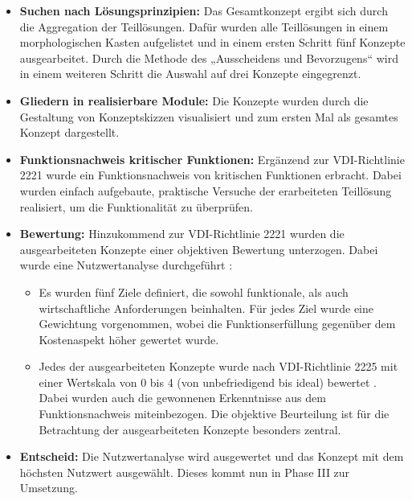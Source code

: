 \begin{itemize}
	\item \textbf{Suchen nach Lösungsprinzipien:} Das Gesamtkonzept ergibt sich durch die Aggregation der Teillösungen. Dafür wurden alle Teillösungen in einem morphologischen Kasten aufgelistet und in einem ersten Schritt fünf Konzepte ausgearbeitet. Durch die Methode des „Ausscheidens und Bevorzugens“ \cite{naefe} wird in einem weiteren Schritt die Auswahl auf drei Konzepte eingegrenzt.
	
	\item \textbf{Gliedern in realisierbare Module:} Die Konzepte wurden durch die Gestaltung von Konzeptskizzen visualisiert und zum ersten Mal als gesamtes Konzept dargestellt. 
	
	\item \textbf{Funktionsnachweis kritischer Funktionen:} Ergänzend zur VDI-Richtlinie 2221 wurde ein Funktionsnachweis von kritischen Funktionen erbracht. Dabei wurden einfach aufgebaute, praktische Versuche der erarbeiteten Teillösung realisiert, um die Funktionalität zu überprüfen.
	
	\item \textbf{Bewertung:} Hinzukommend zur VDI-Richtlinie 2221 wurden die ausgearbeiteten Konzepte einer objektiven Bewertung unterzogen. Dabei wurde eine Nutzwertanalyse durchgeführt \cite{pahl}:
	\begin{itemize}
		\item Es wurden fünf Ziele definiert, die sowohl funktionale, als auch wirtschaftliche Anforderungen beinhalten. Für jedes Ziel wurde eine Gewichtung vorgenommen, wobei die Funktionserfüllung gegenüber dem Kostenaspekt höher gewertet wurde.
		
		\item Jedes der ausgearbeiteten Konzepte wurde nach VDI-Richtlinie 2225 mit einer Wertskala von 0 bis 4 (von unbefriedigend bis ideal) bewertet \cite{vdi2225}. Dabei wurden auch die gewonnenen Erkenntnisse aus dem Funktionsnachweis miteinbezogen. Die objektive Beurteilung ist für die Betrachtung der ausgearbeiteten Konzepte besonders zentral.
	\end{itemize}	
	
	\item \textbf{Entscheid:} Die Nutzwertanalyse wird ausgewertet und das Konzept mit dem höchsten Nutzwert ausgewählt. Dieses kommt nun in Phase III zur Umsetzung. 
\end{itemize}

